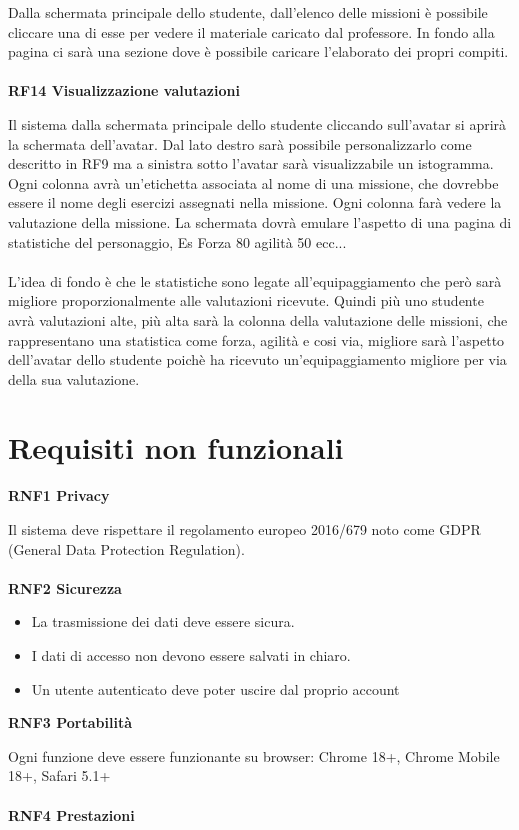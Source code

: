 Dalla schermata principale dello studente, dall'elenco delle missioni è possibile cliccare una di esse per vedere il materiale caricato dal professore. In fondo alla pagina ci sarà una sezione dove è possibile caricare l'elaborato dei propri compiti.\\
\\
\textbf{RF14 Visualizzazione valutazioni}

Il sistema dalla schermata principale dello studente cliccando sull'avatar si aprirà la schermata dell'avatar. Dal lato destro sarà possibile personalizzarlo come descritto in RF9 ma a sinistra sotto l'avatar sarà visualizzabile un istogramma. Ogni colonna avrà un'etichetta associata al nome di una missione, che dovrebbe essere il nome degli esercizi assegnati nella missione. Ogni colonna farà vedere la valutazione della missione. La schermata dovrà emulare l'aspetto di una pagina di statistiche del personaggio, Es Forza 80 agilità 50 ecc...\\
\\
L'idea di fondo è che le statistiche sono legate all'equipaggiamento che però sarà migliore proporzionalmente alle valutazioni ricevute. Quindi più uno studente avrà valutazioni alte, più alta sarà la colonna della valutazione delle missioni, che rappresentano una statistica come forza, agilità e cosi via, migliore sarà l'aspetto dell'avatar dello studente poichè ha ricevuto un'equipaggiamento migliore per via della sua valutazione.
\section{Requisiti non funzionali}

\textbf{RNF1 Privacy}

Il sistema deve rispettare il regolamento europeo 2016/679 noto come GDPR (General Data Protection Regulation).\\
\\
\textbf{RNF2 Sicurezza}

\begin{itemize}
  \item La trasmissione dei dati deve essere sicura.
  \item I dati di accesso non devono essere salvati in chiaro.
  \item Un utente autenticato deve poter uscire dal proprio account
\end{itemize}

\textbf{RNF3 Portabilità}

Ogni funzione deve essere funzionante su browser: Chrome 18+, Chrome Mobile 18+, Safari 5.1+\\
\\
\textbf{RNF4 Prestazioni}

